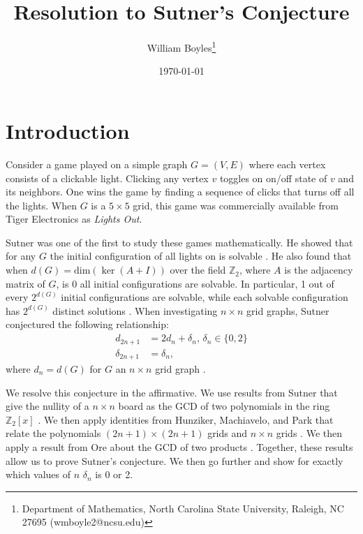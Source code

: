 \documentclass[a4paper]{article}
\newcommand{\Z}{\mathbb{Z}}
\renewcommand{\dim}[1]{\text{dim}\left( #1 \right)}
\begin{document}
	\title{Resolution to Sutner's Conjecture}
	\author{William Boyles\thanks{Department of Mathematics, North Carolina State University, Raleigh, NC 27695 (wmboyle2@ncsu.edu)}}
	\date{\today}
	\maketitle
	
	\section{Introduction}
	Consider a game played on a simple graph $G = (V,E)$ where each vertex consists of a clickable light.
	Clicking any vertex $v$ toggles on on/off state of $v$ and its neighbors.
	One wins the game by finding a sequence of clicks that turns off all the lights.
	When $G$ is a $5 \times 5$ grid, this game was commercially available from Tiger Electronics as \textit{Lights Out}.
	
	Sutner was one of the first to study these games mathematically.
	He showed that for any $G$ the initial configuration of all lights on is solvable \cite{Sutner1989}.
	He also found that when $d(G) = \dim{\ker{(A + I)}}$ over the field $\Z_2$, where $A$ is the adjacency matrix of $G$, is 0 all initial configurations are solvable.
	In particular, 1 out of every $2^{d(G)}$ initial configurations are solvable, while each solvable configuration has $2^{d(G)}$ distinct solutions \cite{Sutner1989}.
	When investigating $n \times n$ grid graphs, Sutner conjectured the following relationship:
	\begin{align*}
		d_{2n+1} &= 2d_n + \delta_n \text{, } \delta_n \in \{0,2\} \\
		\delta_{2n+1} &= \delta_n,
	\end{align*}
	where $d_n = d(G)$ for $G$ an $n \times n$ grid graph \cite{Sutner1989}.
	
	We resolve this conjecture in the affirmative.
	We use results from Sutner that give the nullity of a $n \times n$ board as the GCD of two polynomials in the ring $\Z_2[x]$ \cite{Sutner96sigma-automataand}.
	We then apply identities from Hunziker, Machiavelo, and Park that relate the polynomials $(2n+1) \times (2n+1)$ grids and $n \times n$ grids \cite{HUNZIKER2004465}.
	We then apply a result from Ore about the GCD of two products \cite{ore_number_theory}.
	Together, these results allow us to prove Sutner's conjecture.
	We then go further and show for exactly which values of $n$ $\delta_n$ is 0 or 2.
	
\end{document}

